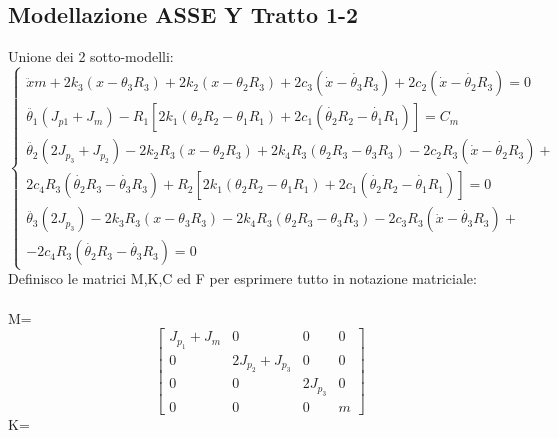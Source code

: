 \documentclass{article}
\begin{document}
\subsection{Modellazione ASSE Y  Tratto 1-2} 
Unione dei 2 sotto-modelli:
\begin{equation*}
\begin{cases}
 \ddot{x}m + 2k_{3}(x-\theta_{3}R_{3}) + 2k_{2}(x- \theta_{2}R_{3})+ 2c_{3}(\dot{x}-\dot{\theta_3}R_{3}) + 2c_{2}(\dot{x} - \dot{\theta_{2}}R_{3}) = 0\\
\ddot{\theta_{1}}(J_{p1}+J_{m}) - R_{1}[2k_{1}(\theta_{2}R_{2}-\theta_{1}R_{1})+ 2c_{1}(\dot{\theta_{2}}R_{2}-\dot{\theta_{1}}R_{1})] = C_m\\
\ddot{\theta_2}(2J_{p_3}+J_{p_2}) - 2k_{2}R_{3}(x - \theta_{2}R_{3}) + 2k_{4}R_3(\theta_{2}R_3 - \theta_{3}R_{3}) - 2c_{2}R_{3}(\dot{x}-\dot{\theta_2}R_{3}) +\\ 2c_{4}R_{3}(\dot{\theta_2}R_3 - \dot{\theta_{3}}R_{3}) +
R_{2}[2k_{1}(\theta_{2}R_{2}-\theta_{1}R_{1})+ 2c_{1}(\dot{\theta_{2}}R_{2}-\dot{\theta_{1}}R_{1})] = 0\\
\ddot{\theta_3}(2J_{p_3}) - 2k_{3}R_{3}(x - \theta_{3}R_{3}) - 2k_{4}R_3(\theta_{2}R_3 - \theta_{3}R_{3}) - 2c_{3}R_{3}(\dot{x}-\dot{\theta_3}R_{3})+\\ - 2c_{4}R_{3}(\dot{\theta_2}R_3 - \dot{\theta_{3}}R_{3}) = 0
\end{cases}
\end{equation*}
Definisco le matrici M,K,C ed F per esprimere tutto in notazione matriciale:
\\
\\
M= 
$$
\begin{bmatrix}
J_{p_1}+J_m & 0 & 0 & 0\\
0 &  2J_{p_2}+J_{p_3} & 0 & 0\\
0 & 0 & 2J_{p_3} & 0\\
0 & 0 & 0 &  m
\end{bmatrix}
$$
K= 
\end{document}
